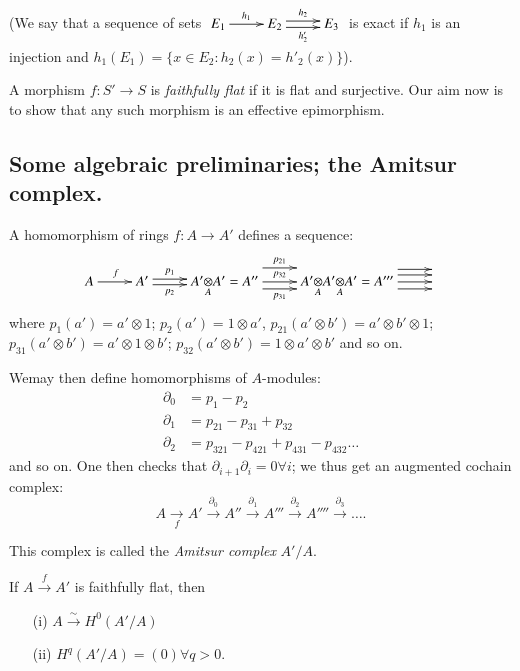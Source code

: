 (We say that a sequence of sets $\xymatrix{E_{1}\ar[r]^{h_{1}} &
  E_{2}\ar@<.5ex>[r]^{h_{2}}\ar@<-.5ex>[r]_{h'_{2}}& E_{3}}$ is exact
if $h_{1}$ is an injection and $h_{1}(E_{1})=\{x\in
E_{2}:h_{2}(x)=h'_{2}(x)\}$). 

A morphism $f:S'\to S$ is {\em faithfully flat} if it is flat and
surjective. Our aim now is to show that any such morphism is an
effective epimorphism.

\subsection{Some algebraic preliminaries; the Amitsur
  complex.}\label{chap3-sec3.4.1} 

A homomorphism of rings $f:A\to A'$ defines a sequence:
\[
\xymatrix{
A\ar[r]^{f} & A'\ar@<.2em>[r]^-{p_{1}}\ar@<-.2em>[r]_-{p_{2}} &
\foprod{A'}{A'}{A}=A''\ar@<1em>[r]^-{p_{21}}\ar[r]^-{p_{32}}\ar@<-.5em>[r]_-{p_{31}}  
&
\foprod{A'}{\foprod{A'}{A'}{A}}{A}=A'''
\ar@<.9em>[r]\ar@<.5em>[r]\ar[r]\ar@<-.5em>[r]  &
}
\]
where $p_{1}(a')=a'\otimes 1$; $p_{2}(a')=1\otimes a'$,
$p_{21}(a'\otimes b')=a'\otimes b'\otimes 1$; $p_{31}(a'\otimes
b')=a'\otimes 1\otimes b'$; $p_{32}(a'\otimes b')=1\otimes a'\otimes
b'$ and so on.

We\pageoriginale may then define homomorphisms of $A$-modules:
\begin{align*}
\partial_{0} &= p_{1}-p_{2}\\
\partial_{1} &= p_{21}-p_{31}+p_{32}\\
\partial_{2} &= p_{321}-p_{421}+p_{431}-p_{432}\ldots
\end{align*}
and so on. One then checks that $\partial_{i+1}\partial_{i}=0\forall
i$; we thus get an augmented cochain complex:
$$
A\xrightarrow[f]{}A'\xrightarrow{\partial_{0}}A''\xrightarrow{\partial_{1}}A'''\xrightarrow{\partial_{2}}A''''\xrightarrow{\partial_{3}}\ldots .
$$

This complex is called the {\em Amitsur complex} $A'/A$.

\setcounter{subsection}{1}
\begin{sublemma}\label{chap3-lem3.4.1.1}
If $A\xrightarrow{f}A'$ is faithfully flat, then
\begin{itemize}
\item[\rm(i)] $A\xrightarrow{\sim}H^{0}(A'/A)$

\item[\rm(ii)] $H^{q}(A'/A)=(0)\forall q>0$.
\end{itemize}
\end{sublemma}

